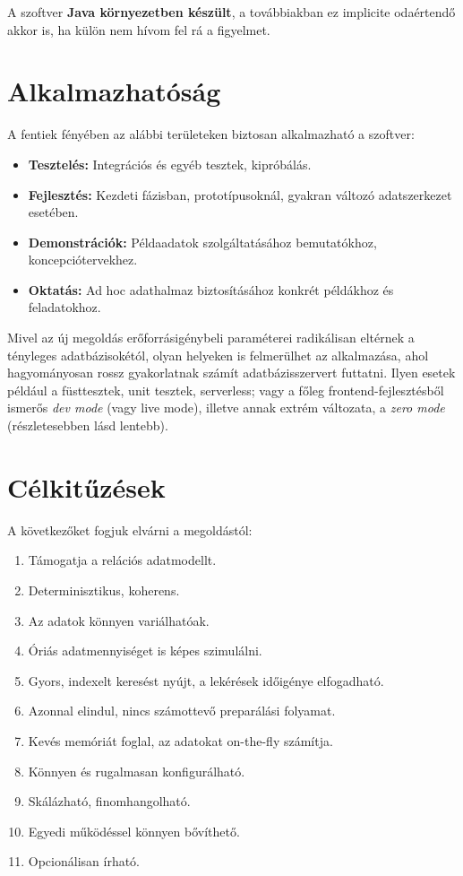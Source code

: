 \documentclass[
    parspace,
    noindent,
    nohyp,
]{elteiktdk}[2023/04/10]
\begin{document}
A szoftver \textbf{Java környezetben készült},
a továbbiakban ez implicite odaértendő akkor is,
ha külön nem hívom fel rá a figyelmet.

\section{Alkalmazhatóság}

A fentiek fényében az alábbi területeken biztosan alkalmazható a szoftver:

\begin{itemize}
    \setlength\itemsep{-0.4em}
    \item \textbf{Tesztelés:} Integrációs és egyéb tesztek, kipróbálás.
    \item \textbf{Fejlesztés:} Kezdeti fázisban, prototípusoknál, gyakran változó adatszerkezet esetében.
    \item \textbf{Demonstrációk:} Példaadatok szolgáltatásához bemutatókhoz, koncepciótervekhez.
    \item \textbf{Oktatás:} Ad hoc adathalmaz biztosításához konkrét példákhoz és feladatokhoz.
\end{itemize}

Mivel az új megoldás erőforrásigénybeli paraméterei
radikálisan eltérnek a tényleges adatbázisokétól,
olyan helyeken is felmerülhet az alkalmazása,
ahol hagyományosan rossz gyakorlatnak számít adatbázisszervert futtatni.
Ilyen esetek például a füsttesztek, unit tesztek, serverless;
vagy a főleg frontend-fejlesztésből ismerős \textit{dev mode} (vagy live mode),
illetve annak extrém változata, a \textit{zero mode} (részletesebben lásd lentebb).

\section{Célkitűzések}

A következőket fogjuk elvárni a megoldástól:

\begin{enumerate}
    \item Támogatja a relációs adatmodellt.
    \item Determinisztikus, koherens.
    \item Az adatok könnyen variálhatóak.
    \item Óriás adatmennyiséget is képes szimulálni.
    \item Gyors, indexelt keresést nyújt, a lekérések időigénye elfogadható.
    \item Azonnal elindul, nincs számottevő preparálási folyamat.
    \item Kevés memóriát foglal, az adatokat on-the-fly számítja.
    \item Könnyen és rugalmasan konfigurálható.
    \item Skálázható, finomhangolható.
    \item Egyedi működéssel könnyen bővíthető.
    \item Opcionálisan írható.
\end{enumerate}
\end{document}
